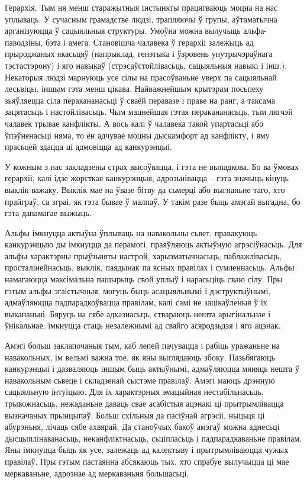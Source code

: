 Герархія. Тым ня менш старажытныя інстынкты працягваюць моцна на нас уплываць. У сучасным грамадстве людзі, трапляючы ў групы, аўтаматычна арганізуюцца ў сацыяльныя структуры. Умоўна можна вылучыць альфа-паводзіны, бэта і амега. Становішча чалавека ў герархіі залежыць ад прыроджаных якасьцяў (напрыклад, генэтыка і ўзровень унутрычэраўнага тэстастэрону) і яго навыкаў (стрэсаўстойлівасьць, сацыяльныя навыкі і інш.). Некаторыя людзі марнуюць усе сілы на прасоўваньне уверх па сацыяльнай лесьвіцы, іншым гэта менш цікава. Найважнейшым крытэрам посьпеху зьяўляецца сіла перакананасьці ў сваёй перавазе і праве на ранг, а таксама зацятасьць і настойлівасьць. Чым мацнейшая гэтая перакананасьць, тым лягчэй чалавек трывае канфлікты. А вось калі ў чалавека такой упартасьці або ўпэўненасьці няма, то ён адчувае моцны дыскамфорт ад канфлікту, і яму прасьцей здацца ці адмовіцца ад канкурэнцыі.

У кожным з нас закладзены страх высоўвацца, і гэта не выпадкова. Бо ва ўмовах герархіі, калі ідзе жорсткая канкурэнцыя, адрозьнівацца – гэта значыць кінуць выклік важаку. Выклік мае на ўвазе бітву да сьмерці або выгнаньне таго, хто прайграў, са зграі, як гэта бывае ў малпаў. У такім разе быць амэгай выгадна, бо гэта дапамагае выжыць.

Альфы імкнуцца актыўна ўплываць на навакольны сьвет, правакуюць канкурэнцыю ды імкнуцца да перамогі, праяўляюць актыўную агрэсіўнасьць. Для альфы характэрны прыўзьняты настрой, харызматычнасьць, паблажлівасьць, просталінейнасьць, выклік, паядынак па ясных правілах і сумленнасьць. Альфы намагаюцца максімальна пашырыць свой уплыў і нарасьціць сваю сілу. Пры гэтым альфы эгаістычныя, могуць быць асацыяльнымі і дэструктыўнымі, адмаўляюцца падпарадкоўвацца правілам, калі самі не зацікаўленыя ў іх выкананьні. Бяруць на сябе адказнасьць, ствараюць нешта арыгінальнае і ўнікальнае, імкнуцца стаць незалежнымі ад свайго асяродзьдзя і яго ацэнак.

Амэгі больш заклапочаныя тым, каб лепей пачувацца і рабіць уражаньне на навакольных, ім вельмі важна тое, як яны выглядаюць збоку. Пазьбягаюць канкурэнцыі і дазваляюць іншым быць актыўнымі, адмаўляюцца мяняць нешта ў навакольным сьвеце і складзенай сыстэме правілаў. Амэгі маюць дрэнную сацыяльную інтуіцыю. Для іх характэрныя эмацыйная нестабільнасьць, трывожнасьць, нежаданьне даваць свае асабістыя ацэнакі ці прытрымлівацца вызначаных прынцыпаў. Больш схільныя да пасіўнай агрэсіі, ныцьця ці абурэньня, лічаць сябе ахвярай. Да станоўчых бакоў амэгаў можна аднесьці дысцыплінаванасьць, неканфліктнасьць, сьціпласьць і падпарадкаваньне правілам. Яны імкнуцца быць як усе, залежаць ад калектыву і прытрымліваюцца чужых правілаў. Пры гэтым пастаянна абсякаюць тых, хто спрабуе вылучыцца ці мае меркаваньне, адрознае ад меркаваньня большасьці.


